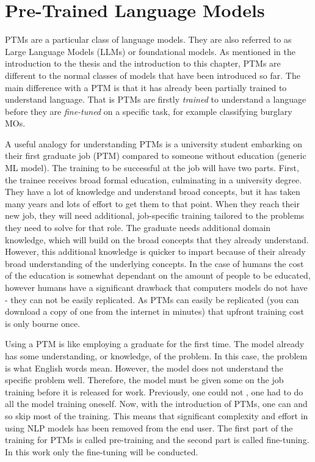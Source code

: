 \section{Pre-Trained Language Models} PTMs are a particular class of language models. They are also referred to as Large Language Models (LLMs) or foundational models. As mentioned in the introduction to the thesis and the introduction to this chapter, PTMs are different to the normal classes of models that have been introduced so far. The main difference with a PTM is that it has already been partially trained to understand language. That is PTMs are firstly \emph{trained} to understand a language before they are \emph{fine-tuned} on a specific task, for example classifying burglary MOs.

A useful analogy for understanding PTMs is a university student embarking on their first graduate job (PTM) compared to someone without education (generic ML model). The training to be successful at the job will have two parts. First, the trainee receives broad formal education,  culminating in a university degree. They have a lot of knowledge and understand broad concepts, but it has taken many years and lots of effort to get them to that point. When they reach their new job, they will need additional, job-specific training tailored to the problems they need to solve for that role. The graduate needs additional domain knowledge, which will build on the broad concepts that they already understand. However, this additional knowledge is quicker to impart because of their already broad understanding of the underlying concepts. In the case of humans the cost of the education is somewhat dependant on the amount of people to be educated, however humans have a significant drawback that computers models do not have - they can not be easily replicated. As PTMs can easily be replicated (you can download a copy of one from the internet in minutes) that upfront training cost is only bourne once.

Using a PTM is like employing a graduate for the first time. The model already has some understanding, or knowledge, of the problem. In this case, the problem is what English words mean. However, the model does not understand the specific problem well. Therefore, the model must be given some on the job training before it is released for work. Previously, one could not , one had to do all the model training oneself. Now, with the introduction of PTMs, one can  and so skip most of the training.  This means that significant complexity and effort in using NLP models has been removed from the end user. The first part of the training for PTMs is called pre-training and the second part is called fine-tuning. In this work only the fine-tuning will be conducted.

